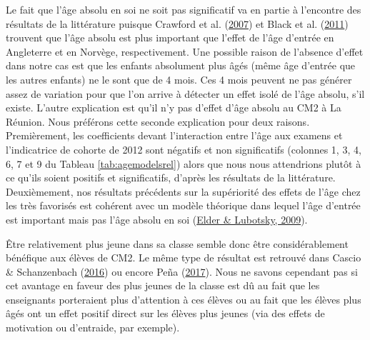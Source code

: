 \documentclass[
]{book}
\begin{document}
\quad Le fait que l'âge absolu en soi ne soit pas significatif va en partie à l'encontre des résultats de la littérature puisque Crawford et al. (\protect\hyperlink{ref-CRA:eal:07}{2007}) et Black et al. (\protect\hyperlink{ref-BLA:eal:11}{2011}) trouvent que l'âge absolu est plus important que l'effet de l'âge d'entrée en Angleterre et en Norvège, respectivement. Une possible raison de l'absence d'effet dans notre cas est que les enfants absolument plus âgés (même âge d'entrée que les autres enfants) ne le sont que de 4 mois. Ces 4 mois peuvent ne pas générer assez de variation pour que l'on arrive à détecter un effet isolé de l'âge absolu, s'il existe. L'autre explication est qu'il n'y pas d'effet d'âge absolu au CM2 à La Réunion. Nous préférons cette seconde explication pour deux raisons. Premièrement, les coefficients devant l'interaction entre l'âge aux examens et l'indicatrice de cohorte de 2012 sont négatifs et non significatifs (colonnes 1, 3, 4, 6, 7 et 9 du Tableau \ref{tab:agemodelsrel}) alors que nous nous attendrions plutôt à ce qu'ils soient positifs et significatifs, d'après les résultats de la littérature. Deuxièmement, nos résultats précédents sur la supériorité des effets de l'âge chez les très favorisés est cohérent avec un modèle théorique dans lequel l'âge d'entrée est important mais pas l'âge absolu en soi (\protect\hyperlink{ref-ELD:LUB:09}{Elder \& Lubotsky, 2009}).

\quad Être relativement plus jeune dans sa classe semble donc être considérablement bénéfique aux élèves de CM2. Le même type de résultat est retrouvé dans Cascio \& Schanzenbach (\protect\hyperlink{ref-CAS:SCH:16}{2016}) ou encore Peña (\protect\hyperlink{ref-PEN:17}{2017}). Nous ne savons cependant pas si cet avantage en faveur des plus jeunes de la classe est dû au fait que les enseignants porteraient plus d'attention à ces élèves ou au fait que les élèves plus âgés ont un effet positif direct sur les élèves plus jeunes (via des effets de motivation ou d'entraide, par exemple).

\newpage
\begingroup\fontsize{7}{9}\selectfont
\end{document}
